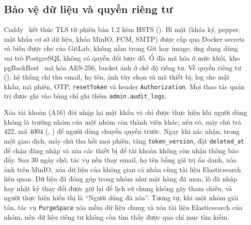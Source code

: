 \subsection{Bảo vệ dữ liệu và quyền riêng tư}\label{ssec:bao-ve-du-lieu}

Caddy~\cite{caddy} kết thúc TLS từ phiên bản 1.2 kèm HSTS (). Bí mật (khóa ký, pepper, mật khẩu cơ sở dữ liệu, khóa MinIO, FCM, SMTP) được cấp qua Docker secrets và biến được che của GitLab, không nằm trong Git hay image; ứng dụng dùng vai trò PostgreSQL không có quyền đổi lược đồ. Ổ đĩa mã hóa ở mức khối, kho pgBackRest~\cite{pgbackrest} mã hóa AES-256, bucket ảnh ở chế độ riêng tư. Về quyền riêng tư (), hệ thống chỉ thu email, họ tên, ảnh tùy chọn và mã thiết bị; log che mật khẩu, mã phiên, OTP, \texttt{resetToken} và header \texttt{Authorization}. Mọi thao tác quản trị được ghi vào bảng chỉ ghi thêm \texttt{admin.audit\_logs}.

Xóa tài khoản (A16) đòi nhập lại mật khẩu và chỉ được thực hiện khi người dùng không là trưởng nhóm của một nhóm còn thành viên khác; nếu có, máy chủ trả 422, mã 4004 (, ) để người dùng chuyển quyền trước. Ngay khi xác nhận, trong một giao dịch, máy chủ thu hồi mọi phiên, tăng \texttt{token\_version}, đặt \texttt{deleted\_at} để chặn đăng nhập và xóa các thiết bị để tài khoản không còn nhận thông báo đẩy. Sau 30 ngày chờ, tác vụ nền thay email, họ tên bằng giá trị ẩn danh, xóa ảnh trên MinIO, xóa dữ liệu của không gian cá nhân cùng tài liệu Elasticsearch liên quan. Dữ liệu đã đóng góp trong nhóm như mặt hàng đã mua, lô đã nhập hay nhật ký thay đổi được giữ lại để lịch sử chung không gãy tham chiếu, và người thực hiện hiển thị là “Người dùng đã xóa”. Tương tự, khi một nhóm giải tán, tác vụ \texttt{PurgeSpace} xóa mềm dữ liệu chung và xóa tài liệu Elasticsearch của nhóm, nên dữ liệu riêng tư không còn tìm thấy được qua chỉ mục tìm kiếm.
